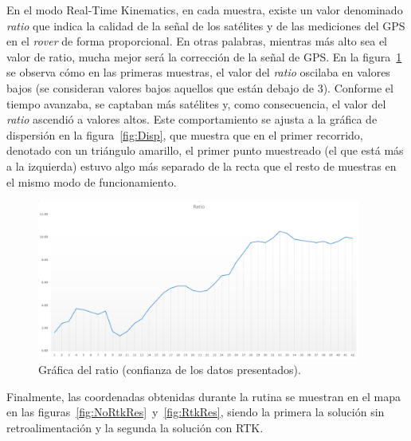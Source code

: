 En el modo Real-Time Kinematics, en cada muestra, existe un valor denominado \textit{ratio} que indica la calidad de la señal de los satélites y de las mediciones del GPS en el \textit{rover} de forma proporcional. En otras palabras, mientras más alto sea el valor de ratio, mucha mejor será la corrección de la señal de GPS. En la figura~\ref{fig:Ratio} se observa cómo en las primeras muestras, el valor del \textit{ratio} oscilaba en valores bajos (se consideran valores bajos aquellos que están debajo de 3). Conforme el tiempo avanzaba, se captaban más satélites y, como consecuencia, el valor del \textit{ratio} ascendió a valores altos. Este comportamiento se ajusta a la gráfica de dispersión en la figura~\ref{fig:Disp}, que muestra que en el primer recorrido, denotado con un triángulo amarillo, el primer punto muestreado (el que está más a la izquierda) estuvo algo más separado de la recta que el resto de muestras en el mismo modo de funcionamiento.

\begin{figure}[H]
\centering
\includegraphics[width=0.95\textwidth]{Figures/Ratio}
\caption[Gráfica del ratio (confianza de los datos presentados).]{Gráfica del ratio (confianza de los datos presentados).}
\label{fig:Ratio}
\end{figure}

Finalmente, las coordenadas obtenidas durante la rutina se muestran en el mapa en las figuras~\ref{fig:NoRtkRes}~y~\ref{fig:RtkRes}, siendo la primera la solución sin retroalimentación y la segunda la solución con RTK.

